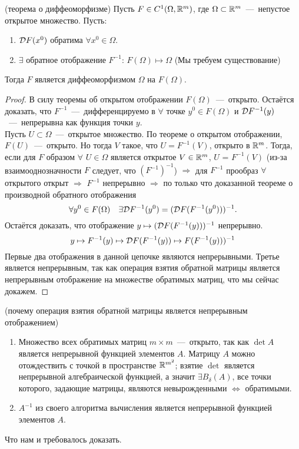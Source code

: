 \begin{theorem}
(теорема о диффеоморфизме) Пусть $F \in C^{1}(\Omega, \mathbb{R}^m)$, где $\Omega \subset \mathbb{R}^m$~---~непустое открытое множество. 
Пусть:
\begin{enumerate}
    \item $\mathcal{D} F(x^0)$ обратима $\forall x^0 \in \Omega$.
    \item $\exists$ обратное отображение $F^{-1}$: $F(\Omega) \mapsto \Omega$ (Мы требуем существование)
\end{enumerate}
Тогда $F$ является диффеоморфизмом $\Omega$ на $F(\Omega)$.
\end{theorem}
\begin{proof}
    В силу теоремы об открытом отображении $F(\Omega)$~---~открыто. Остаётся доказать, что $F^{-1}$~---~дифференцируемо в $\forall$ точке $y^0 \in F(\Omega)$ и $\mathcal{D} F^{-1}(y)$~---~непрерывна как функция точки $y$. \\
    Пусть $U \subset \Omega$~---~открытое множество. По теореме о открытом отображении, $F(U)$~---~открыто. Но тогда $V$ такое, что $U = F^{-1}(V)$, открыто в $\mathbb{R}^m$. Тогда, если для $F$ образом $\forall$ $U \in \Omega$ является открытое $V \in \mathbb{R}^m$, $U$ = $F^{-1}(V)$ (из-за взаимооднозначности $F$ следует, что $(F^{-1})^{-1}$) $\Rightarrow$ для $F^{-1}$ прообраз $\forall$ открытого открыт $\Rightarrow$ $F^{-1}$ непрерывно $\Rightarrow$ по только что доказанной теореме о производной обратного отображения
    \[
    \forall y^0 \in F(\Omega)\quad \exists \mathcal{D} F^{-1}(y^0) = (\mathcal{D} F(F^{-1}(y^0)))^{-1}.
    \]
    Остаётся доказать, что отображение $y \mapsto (\mathcal{D} F(F^{-1}(y)))^{-1}$ непрерывно.
    \[
    y \mapsto F^{-1}(y) \mapsto \mathcal{D} F(F^{-1}(y)) \mapsto F(F^{-1}(y)))^{-1}
    \]
    Первые два отображения в данной цепочке являются непрерывными. Третье является непрерывным, так как операция взятия обратной матрицы является непрерывным отображение на множестве обратимых матриц, что мы сейчас докажем.
\end{proof}

\begin{explanation} (почему операция взятия обратной матрицы является непрерывным отображением)
\begin{enumerate}
    \item Множество всех обратимых матриц $m \times m$~---~открыто, так как $\det A$ является непрерывной функцией элементов $A$. Матрицу $A$ можно отождествить с точкой в пространстве $\mathbb{R}^{m^2}$; взятие $\det$ является непрерывной алгебраической функцией, а значит $\exists B_{\delta}(A)$, все точки которого, задающие матрицы, являются невырожденными $\Leftrightarrow$ обратимыми.
    \item $A^{-1}$ из своего алгоритма вычисления является непрерывной функцией элементов $A$. 
\end{enumerate}
Что нам и требовалось доказать.
\end{explanation}



